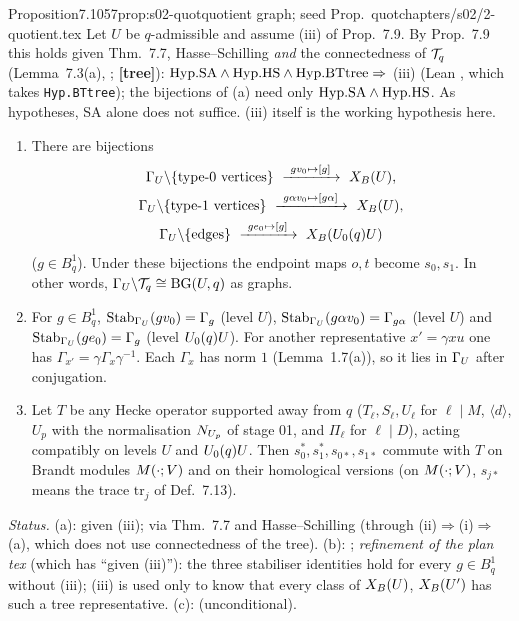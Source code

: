 \begin{quoted}{Proposition}{7.10}{57}{prop:s02-quot}{quotient graph; seed Prop.~quot}{chapters/s02/2-quotient.tex}\label{rpt:prop:s02-quot}
Let $U$ be $q$-admissible and assume (iii) of Prop.~7.9. By Prop.~7.9 this holds given
Thm.~7.7, Hasse--Schilling \emph{and} the connectedness of $\mathcal{T}_q$ (Lemma~7.3(a), \stcited; \textbf{[tree]}):
$\mathrm{Hyp.SA}\wedge\mathrm{Hyp.HS}\wedge\mathrm{Hyp.BTtree}\Rightarrow$ (iii) (Lean , which takes \texttt{Hyp.BTtree});
the bijections of (a) need only $\mathrm{Hyp.SA}\wedge\mathrm{Hyp.HS}$. As hypotheses, SA alone does not suffice.
(iii) itself is the working hypothesis here.
\begin{enumerate}[label=(\alph*)]
\item There are bijections
  \begin{gather*}
    \GU\backslash\{\text{type-}0\text{ vertices}\}\ \xrightarrow{\ gv_0\mapsto[g]\ }\ \XB{U},\\
    \GU\backslash\{\text{type-}1\text{ vertices}\}\ \xrightarrow{\ g\alpha v_0\mapsto[g\alpha]\ }\ \XB{U},\\
    \GU\backslash\{\text{edges}\}\ \xrightarrow{\ ge_0\mapsto[g]\ }\ \XB{\Uzero{q}U}
  \end{gather*}
  ($g\in B^1_q$). Under these bijections the endpoint maps $o,t$ become $s_0,s_1$. In other words,
  $\Gamma_U\backslash\mathcal{T}_q\cong\mathrm{BG}(U,q)$ as graphs.
\item For $g\in B^1_q$, $\operatorname{Stab}_{\Gamma_U}(gv_0)=\Gamma_g$ (level $U$), $\operatorname{Stab}_{\Gamma_U}(g\alpha v_0)=\Gamma_{g\alpha}$
  (level $U$) and $\operatorname{Stab}_{\Gamma_U}(ge_0)=\Gamma_g$ (level $U_0(q)U$). For another representative
  $x'=\gamma xu$ one has $\Gamma_{x'}=\gamma\Gamma_x\gamma^{-1}$. Each $\Gamma_x$ has norm $1$
  (Lemma~1.7(a)), so it lies in $\Gamma_U$ after conjugation.
\item Let $T$ be any Hecke operator supported away from $q$ ($T_\ell,S_\ell,U_\ell$ for $\ell\mid M$,
  $\langle d\rangle$, $U_p$ with the normalisation $N_{U_p}$ of stage 01, and $\Pi_\ell$ for $\ell\mid D$),
  acting compatibly on levels $U$ and $U_0(q)U$. Then $s_0^*,s_1^*,s_{0*},s_{1*}$ commute with $T$ on
  Brandt modules $M(\cdot;V)$ and on their homological versions (on $M(\cdot;V)$, $s_{j*}$ means the trace
  $\mathrm{tr}_j$ of Def.~7.13).
\end{enumerate}
\par\smallskip{}\par
\noindent\emph{Status.} (a): \stproved{} given (iii); \stpmc{} via Thm.~7.7 and Hasse--Schilling (through
(ii)$\Rightarrow$(i)$\Rightarrow$(a), which does not use connectedness of the tree). (b): \stproved; \emph{refinement of the plan tex} (which has ``given (iii)''): the three stabiliser identities
hold for every $g\in B^1_q$ without (iii); (iii) is used only to know that every class of $X_B(U)$, $X_B(U')$ has such a tree
representative. (c): \stproved{} (unconditional).
\end{quoted}
